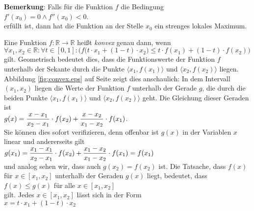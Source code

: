\noindent
\textbf{Bemerkung}: Falls f\"ur die Funktion $f$ die Bedingung
\\[0.2cm]
\hspace*{1.3cm}
$f'(x_0) = 0 \wedge f''(x_0) < 0$.
\\[0.2cm]
erf\"ullt ist, dann hat die Funktion an der Stelle $x_0$ ein strenges lokales Maximum. \eox


\begin{Definition}
Eine Funktion $f:\mathbb{R} \rightarrow \mathbb{R}$ hei{\ss}t \emph{konvex} genau dann, wenn 
\\[0.2cm]
\hspace*{1.3cm}
$\forall x_1,x_2 \in \mathbb{R}:\forall t\in [0,1]: \bigl(
  f\bigl(t \cdot x_1 + (1-t)\cdot x_2\bigr) \leq t \cdot f(x_1) + (1 - t) \cdot f(x_2)
  \bigr)
$
\\[0.2cm]
gilt.  Geometrisch bedeutet dies, dass die Funktionswerte der Funktion $f$  unterhalb
der Sekante durch die Punkte 
$\bigl\langle x_1, f(x_1) \bigl\rangle$ und $\bigl\langle x_2, f(x_2) \bigl\rangle$
liegen.  Abbildung \ref{fig:convex.eps} auf Seite \pageref{fig:convex.eps} zeigt dies anschaulich: 
In dem Intervall $(x_1,x_2)$ liegen die Werte der Funktion $f$ unterhalb der Gerade $g$, die durch die beiden Punkte 
$\langle x_1, f(x_1)\rangle$ und $\langle x_2, f(x_2)\rangle$ geht.  Die Gleichung dieser Geraden
ist 
\\[0.2cm]
\hspace*{1.3cm}
$\displaystyle g(x) = \frac{x-x_1}{x_2-x_1}\cdot f(x_2) + \frac{x-x_2}{x_1-x_2}\cdot f(x_1)$.
\\[0.2cm]
Sie k\"onnen dies sofort verifizieren, denn offenbar ist $g(x)$ in der Variablen $x$ linear und
andererseits gilt
\\[0.2cm]
\hspace*{1.3cm}
$\displaystyle g(x_1) = \frac{x_1-x_1}{x_2-x_1}\cdot f(x_2)+\frac{x_1-x_2}{x_1-x_2}\cdot f(x_1) = f(x_1)$
\\[0.2cm]
und analog sehen wir, dass auch $g(x_2) = f(x_2)$ ist.  Die Tatsache, dass $f(x)$ f\"ur $x \in [x_1,x_2]$
unterhalb der Geraden $g(x)$ liegt, bedeutet, dass
\\[0.2cm]
\hspace*{1.3cm}
$f(x) \leq g(x)$  \quad f\"ur alle $x \in [x_1,x_2]$
\\[0.2cm]
gilt.  Jedes $x \in [x_1,x_2]$ l\"asst sich in der Form
\\[0.2cm]
\hspace*{1.3cm}
$x = t \cdot x_1 + (1-t) \cdot x_2$
\\[0.2cm]

\end{Definition}
